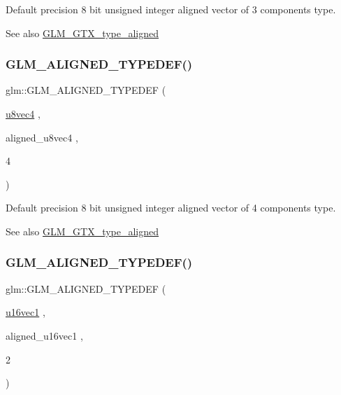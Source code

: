 Default precision 8 bit unsigned integer aligned vector of 3 components type. \begin{DoxySeeAlso}{See also}
\mbox{\hyperlink{group__gtx__type__aligned}{G\+L\+M\+\_\+\+G\+T\+X\+\_\+type\+\_\+aligned}} 
\end{DoxySeeAlso}
\mbox{\label{group__gtx__type__aligned_ga8b8588bb221448f5541a858903822a57}} 
\subsubsection{\texorpdfstring{GLM\_ALIGNED\_TYPEDEF()}{GLM\_ALIGNED\_TYPEDEF()}\hspace{0.1cm}{\footnotesize\ttfamily [124/209]}}
{\footnotesize\ttfamily glm\+::\+G\+L\+M\+\_\+\+A\+L\+I\+G\+N\+E\+D\+\_\+\+T\+Y\+P\+E\+D\+EF (\begin{DoxyParamCaption}\item[{\mbox{\hyperlink{group__gtc__type__precision_gaf3c840b8a90a194559121504ba599197}{u8vec4}}}]{,  }\item[{aligned\+\_\+u8vec4}]{,  }\item[{4}]{ }\end{DoxyParamCaption})}

Default precision 8 bit unsigned integer aligned vector of 4 components type. \begin{DoxySeeAlso}{See also}
\mbox{\hyperlink{group__gtx__type__aligned}{G\+L\+M\+\_\+\+G\+T\+X\+\_\+type\+\_\+aligned}} 
\end{DoxySeeAlso}
\mbox{\label{group__gtx__type__aligned_ga991abe990c16de26b2129d6bc2f4c051}} 
\subsubsection{\texorpdfstring{GLM\_ALIGNED\_TYPEDEF()}{GLM\_ALIGNED\_TYPEDEF()}\hspace{0.1cm}{\footnotesize\ttfamily [125/209]}}
{\footnotesize\ttfamily glm\+::\+G\+L\+M\+\_\+\+A\+L\+I\+G\+N\+E\+D\+\_\+\+T\+Y\+P\+E\+D\+EF (\begin{DoxyParamCaption}\item[{\mbox{\hyperlink{group__gtc__type__precision_ga809cb55e5fed3456686aae96e7e8684c}{u16vec1}}}]{,  }\item[{aligned\+\_\+u16vec1}]{,  }\item[{2}]{ }\end{DoxyParamCaption})}

